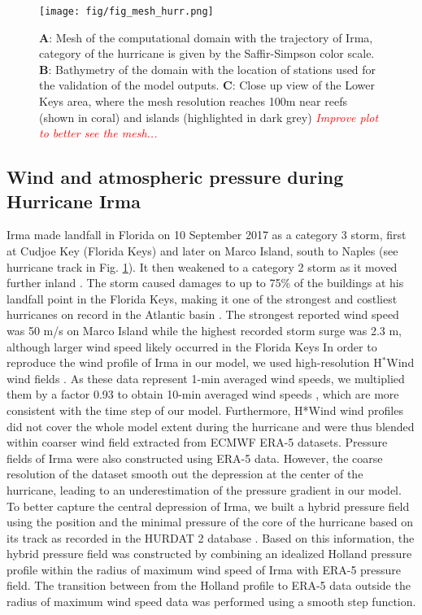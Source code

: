 \documentclass[11pt,a4paper]{article}
\newcommand{\emphc}[1]{\emph{\textcolor{red}{#1}}}
\begin{document}
\begin{figure}
    \centering
    \texttt{[image: fig/fig\_mesh\_hurr.png]}
    \caption{\textbf{A}: Mesh of the computational domain with the trajectory of Irma, category of the hurricane is given by the Saffir-Simpson color scale. \textbf{B}: Bathymetry of the domain with the location of stations used for the validation of the model outputs. \textbf{C}: Close up view of the Lower Keys area, where the mesh resolution reaches 100m near reefs (shown in coral) and islands (highlighted in dark grey) \emphc{Improve plot to better see the mesh...}}
    \label{fig:mesh}
\end{figure}

\subsection{Wind and atmospheric pressure during Hurricane Irma}

Irma made landfall in Florida on 10 September 2017 as a category 3 storm, first at Cudjoe Key (Florida Keys) and later on Marco Island, south to Naples (see hurricane track in Fig. \ref{fig:mesh}). It then weakened to a category 2 storm as it moved further inland \citep{pinelli2018overview}. The storm caused damages to up to 75\% of the buildings at his landfall point in the Florida Keys, making it one of the strongest and costliest hurricanes on record in the Atlantic basin \citep{xian2018brief,zhang2019modeling}. The strongest reported wind speed was 50 m/s on Marco Island while the highest recorded storm surge was 2.3 m, although larger wind speed likely occurred in the Florida Keys \citep{pinelli2018overview}
In order to reproduce the wind profile of Irma in our model, we used high-resolution H$^\ast$Wind wind fields \citep{powell1998hrd}. As these data represent 1-min averaged wind speeds, we multiplied them by a factor 0.93 to obtain 10-min averaged wind speeds \citep{harper2010guidelines}, which are more consistent with the time step of our model. Furthermore, H*Wind wind profiles did not cover the whole model extent during the hurricane and were thus blended within coarser wind field extracted from ECMWF ERA-5 datasets. Pressure fields of Irma were also constructed using ERA-5 data. However, the coarse resolution of the dataset smooth out the depression at the center of the hurricane, leading to an underestimation of the pressure gradient in our model. To better capture the central depression of Irma, we built a hybrid pressure field using the position and the minimal pressure of the core of the hurricane based on its track as recorded in the HURDAT 2 database \citep{landsea2013atlantic}. Based on this information, the hybrid pressure field was constructed by combining an idealized Holland pressure profile \citep{lin2012hurricane} within the radius of maximum wind speed of Irma \citep{knaff2018statistical} with ERA-5 pressure field. The transition between from the Holland profile to ERA-5 data outside the radius of maximum wind speed data was performed using a smooth step function.
\end{document}
